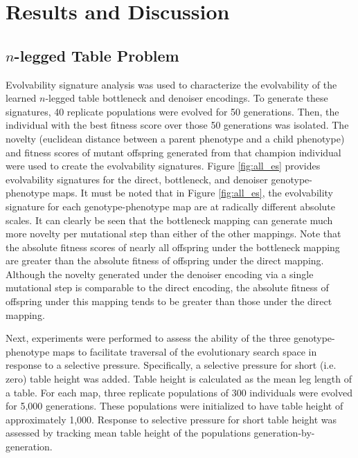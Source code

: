 \section{Results and Discussion} \label{sec:results}

\subsection{$n$-legged Table Problem}



Evolvability signature analysis was used to characterize the evolvability of the learned $n$-legged table bottleneck and denoiser encodings.
To generate these signatures, 40 replicate populations were evolved for 50 generations.
Then, the individual with the best fitness score over those 50 generations was isolated.
The novelty (euclidean distance between a parent phenotype and a child phenotype) and fitness scores of mutant offspring generated from that champion individual were used to create the evolvability signatures.
Figure \ref{fig:all_es} provides evolvability signatures for the direct, bottleneck, and denoiser genotype-phenotype maps.
It must be noted that in Figure \ref{fig:all_es}, the evolvability signature for each genotype-phenotype map are at radically different absolute scales.
It can clearly be seen that the bottleneck mapping can generate much more novelty per mutational step than either of the other mappings.
Note that the absolute fitness scores of nearly all offspring under the bottleneck mapping are greater than the absolute fitness of offspring under the direct mapping.
Although the novelty generated under the denoiser encoding via a single mutational step is comparable to the direct encoding, the absolute fitness of offspring under this mapping tends to be greater than those under the direct mapping.

Next, experiments were performed to assess the ability of the three genotype-phenotype maps to facilitate traversal of the evolutionary search space in response to a selective pressure.
Specifically, a selective pressure for short (i.e. zero) table height was added.
Table height is calculated as the mean leg length of a table.
For each map, three replicate populations of 300 individuals were evolved for 5,000 generations.
These populations were initialized to have table height of approximately 1,000.
Response to selective pressure for short table height was assessed by tracking mean table height of the populations generation-by-generation.

